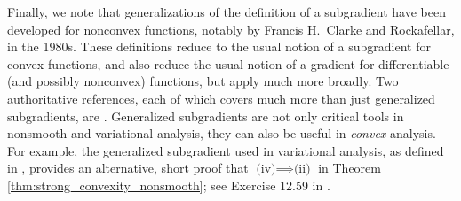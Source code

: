 Finally, we note that generalizations of the definition of a subgradient have
been developed for nonconvex functions, notably by Francis H.\ Clarke and
Rockafellar, in the 1980s. These definitions reduce to the usual notion of a
subgradient for convex functions, and also reduce the usual notion of a gradient
for differentiable (and possibly nonconvex) functions, but apply much more
broadly. Two authoritative references, each of which covers much more than just
generalized subgradients, are \cite{clarke1990optimization,
  rockafellar2009variational}. Generalized subgradients are not only critical
tools in nonsmooth and variational analysis, they can also be useful in
\emph{convex} analysis. For example, the generalized subgradient used in
variational analysis, as defined in \cite{rockafellar2009variational}, provides 
an alternative, short proof that $\text{(iv)} \implies \text{(ii)}$ in Theorem
\ref{thm:strong_convexity_nonsmooth}; see Exercise 12.59 in
\cite{rockafellar2009variational}.   

\clearpage

